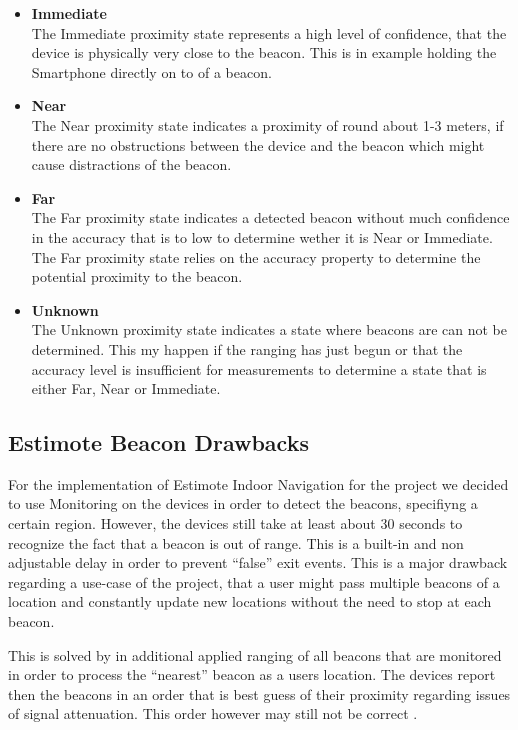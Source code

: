 \begin{itemize}

    \item \textbf{Immediate}\\
    The Immediate proximity state represents a high level of confidence, that the device is physically very close to the beacon. This is in example holding the Smartphone directly on to of a beacon.
    \item \textbf{Near}\\
    The Near proximity state indicates a proximity of round about 1-3 meters, if there are no obstructions between the device and the beacon which might cause distractions of the beacon.
    \item \textbf{Far}\\
    The Far proximity state indicates a detected beacon without much confidence in the accuracy that is to low to determine wether it is Near or Immediate. The Far proximity state relies on the accuracy property to determine the potential proximity to the beacon.
    \item \textbf{Unknown}\\
    The Unknown proximity state indicates a state where beacons are can not be determined. This my happen if the ranging has just begun or that the accuracy level is insufficient for measurements to determine a state that is either Far, Near or Immediate.
\end{itemize}

\subsection{Estimote Beacon Drawbacks}

For the implementation of Estimote Indoor Navigation for the project we decided to use Monitoring on the devices in order to detect the beacons, specifiyng a certain region. However, the devices still take at least about 30 seconds to recognize the fact that a beacon is out of range. This is a  built-in and non adjustable delay in order to prevent \enquote{false} exit events.\cite{developerDocsEstimote} This is a major drawback regarding a use-case of the project, that a user might pass multiple beacons of a location and constantly update new locations without the need to stop at each beacon.

This is solved by in additional applied ranging of all beacons that are monitored in order to process the \enquote{nearest} beacon as a users location. The devices report then the beacons in an order that is best guess of their proximity regarding issues of signal attenuation. This order however may still not be correct \cite{appleIBeacon}.


